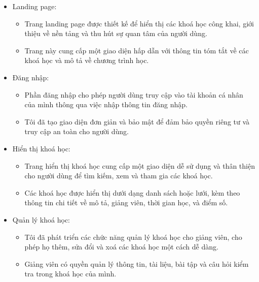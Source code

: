 \documentclass[../Thesis.tex]{subfiles}
\begin{document}
    \begin{itemize}
        \item Landing page:
            \begin{itemize}
                \item Trang landing page được thiết kế để hiển thị các khoá học công khai, giới thiệu về nền tảng và thu hút sự quan tâm của người dùng.
                \item Trang này cung cấp một giao diện hấp dẫn với thông tin tóm tắt về các khoá học và mô tả về chương trình học.
            \end{itemize}
        \item Đăng nhập:
            \begin{itemize}
                \item Phần đăng nhập cho phép người dùng truy cập vào tài khoản cá nhân của mình thông qua việc nhập thông tin đăng nhập.
                \item Tôi đã tạo giao diện đơn giản và bảo mật để đảm bảo quyền riêng tư và truy cập an toàn cho người dùng.
            \end{itemize}
    
        \item Hiển thị khoá học:
            \begin{itemize}
                \item Trang hiển thị khoá học cung cấp một giao diện dễ sử dụng và thân thiện cho người dùng để tìm kiếm, xem và tham gia các khoá học.
                \item Các khoá học được hiển thị dưới dạng danh sách hoặc lưới, kèm theo thông tin chi tiết về mô tả, giảng viên, thời gian học, và điểm số.
            \end{itemize}
        \item Quản lý khoá học:
            \begin{itemize}
                \item Tôi đã phát triển các chức năng quản lý khoá học cho giảng viên, cho phép họ thêm, sửa đổi và xoá các khoá học một cách dễ dàng.
                \item Giảng viên có quyền quản lý thông tin, tài liệu, bài tập và câu hỏi kiểm tra trong khoá học của mình.
            \end{itemize}
   

\end{itemize}
\end{document}
